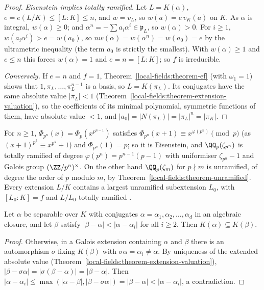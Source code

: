 \begin{proof}
\emph{Eisenstein implies totally ramified.} Let $L = K(\alpha)$, $e = e(L/K) \leq [L : K] \leq n$, and $w = v_L$, so $w(a) = e\,v_K(a)$ on $K$. As $\alpha$ is integral, $w(\alpha) \geq 0$; and
$\alpha^n = -\sum a_i\alpha^i \in \mathfrak{p}_L$, so $w(\alpha) > 0$. For $i \geq 1$, $w(a_i\alpha^i) > e = w(a_0)$, so $nw(\alpha) = w(\alpha^n) = w(a_0) = e$ by the ultrametric inequality (the term $a_0$ is strictly
the smallest). With $w(\alpha) \geq 1$ and $e \leq n$ this forces $w(\alpha) = 1$ and $e = n = [L : K]$; so $f$ is irreducible.

\emph{Conversely.} If $e = n$ and $f = 1$, Theorem~\ref{local-fields:theorem-ef} (with $\omega_1 = 1$) shows that $1, \pi_L, \dots, \pi_L^{n-1}$ is a basis, so $L = K(\pi_L)$. Its conjugates have the same absolute
value $|\pi_L| < 1$ (Theorem~\ref{local-fields:theorem-extension-valuation}), so the coefficients of its minimal polynomial, symmetric functions of them, have absolute value $< 1$, and
$|a_0| = |N(\pi_L)| = |\pi_L|^n = |\pi_K|$.
\end{proof}

\begin{example}\label{local-fields:example-cyclotomic-local}
For $n \geq 1$, $\Phi_{p^n}(x) = \Phi_p(x^{p^{n-1}})$ satisfies $\Phi_{p^n}(x + 1) \equiv x^{\varphi(p^n)} \pmod p$ (as $(x + 1)^{p^k} \equiv x^{p^k} + 1$) and $\Phi_{p^n}(1) = p$; so it is Eisenstein, and
$\QQ_p(\zeta_{p^n})$ is totally ramified of degree $\varphi(p^n) = p^{n-1}(p - 1)$ with uniformiser $\zeta_{p^n} - 1$ and Galois group $(\ZZ/p^n)^\times$. On the other hand $\QQ_p(\zeta_m)$ for $p \nmid m$ is
unramified, of degree the order of $p$ modulo $m$, by Theorem~\ref{local-fields:theorem-unramified}. Every extension $L/K$ contains a largest unramified subextension $L_0$, with $[L_0 : K] = f$ and $L/L_0$
totally ramified \cite[Chapter II, \S 7]{neukirch-ant}.
\end{example}

\begin{lemma}[Krasner]\label{local-fields:lemma-krasner}
Let $\alpha$ be separable over $K$ with conjugates $\alpha = \alpha_1, \alpha_2, \dots, \alpha_d$ in an algebraic closure, and let $\beta$ satisfy $|\beta - \alpha| < |\alpha - \alpha_i|$ for all $i \geq 2$. Then
$K(\alpha) \subseteq K(\beta)$.
\end{lemma}

\begin{proof}
Otherwise, in a Galois extension containing $\alpha$ and $\beta$ there is an automorphism $\sigma$ fixing $K(\beta)$ with $\sigma\alpha = \alpha_i \neq \alpha$. By uniqueness of the extended absolute value
(Theorem~\ref{local-fields:theorem-extension-valuation}), $|\beta - \sigma\alpha| = |\sigma(\beta - \alpha)| = |\beta - \alpha|$. Then
$|\alpha - \alpha_i| \leq \max(|\alpha - \beta|, |\beta - \sigma\alpha|) = |\beta - \alpha| < |\alpha - \alpha_i|$, a contradiction.
\end{proof}

